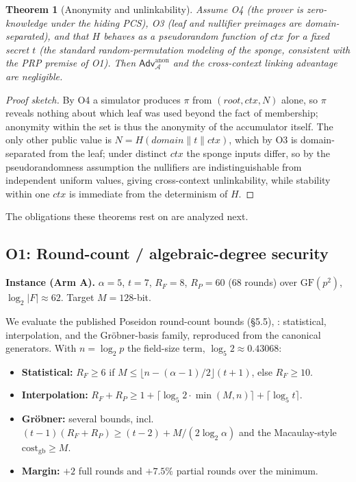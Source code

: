 \documentclass[11pt]{article}
\newcommand{\GF}[1]{\mathrm{GF}(#1)}
\newcommand{\cat}{\mathbin{\|}}          %
\newcommand{\Adv}{\mathsf{Adv}}
\theoremstyle{plain}
\newtheorem{theorem}{Theorem}
\theoremstyle{definition}
\begin{document}
\begin{theorem}[Anonymity and unlinkability]
Assume O4 (the prover is zero-knowledge under the hiding PCS), O3 (leaf and nullifier preimages are
domain-separated), and that $H$ behaves as a pseudorandom function of $\mathit{ctx}$ for a fixed
secret $t$ (the standard random-permutation modeling of the sponge, consistent with the PRP premise of
O1). Then $\Adv^{\mathrm{anon}}_{\mathcal{A}}$ and the cross-context linking advantage are negligible.
\end{theorem}

\begin{proof}[Proof sketch]
By O4 a simulator produces $\pi$ from $(\mathit{root}, \mathit{ctx}, N)$ alone, so $\pi$ reveals
nothing about which leaf was used beyond the fact of membership; anonymity within the set is thus the
anonymity of the accumulator itself. The only other public value is
$N = H(\mathit{domain} \cat t \cat \mathit{ctx})$, which by O3 is domain-separated from the leaf; under
distinct $\mathit{ctx}$ the sponge inputs differ, so by the pseudorandomness assumption the nullifiers
are indistinguishable from independent uniform values, giving cross-context unlinkability, while
stability within one $\mathit{ctx}$ is immediate from the determinism of $H$.
\end{proof}

\noindent The obligations these theorems rest on are analyzed next.

\subsection*{O1: Round-count / algebraic-degree security}

\textbf{Instance (Arm A).} $\alpha = 5$, $t = 7$, $R_F = 8$, $R_P = 60$ ($68$ rounds) over $\GF{p^2}$,
$\log_2|F| \approx 62$. Target $M = 128$-bit.

We evaluate the published Poseidon round-count bounds \cite{GKRRS21} (\S5.5), \cite{ABM23}:
statistical, interpolation, and the Gr\"obner-basis family, reproduced from the canonical
generators. With $n = \log_2 p$ the field-size term, $\log_5 2 \approx 0.43068$:
\begin{itemize}[leftmargin=*]
\item \textbf{Statistical:} $R_F \geq 6$ if $M \leq \lfloor n - (\alpha-1)/2 \rfloor (t+1)$, else
  $R_F \geq 10$.
\item \textbf{Interpolation:} $R_F + R_P \geq 1 + \lceil \log_5 2 \cdot \min(M,n) \rceil +
  \lceil \log_5 t \rceil$.
\item \textbf{Gr\"obner:} several bounds, incl.\ $(t-1)(R_F + R_P) \geq (t-2) + M/(2 \log_2 \alpha)$
  and the Macaulay-style $\mathrm{cost}_{\mathrm{gb}} \geq M$.
\item \textbf{Margin:} $+2$ full rounds and $+7.5\%$ partial rounds over the minimum.
\end{itemize}
\end{document}
